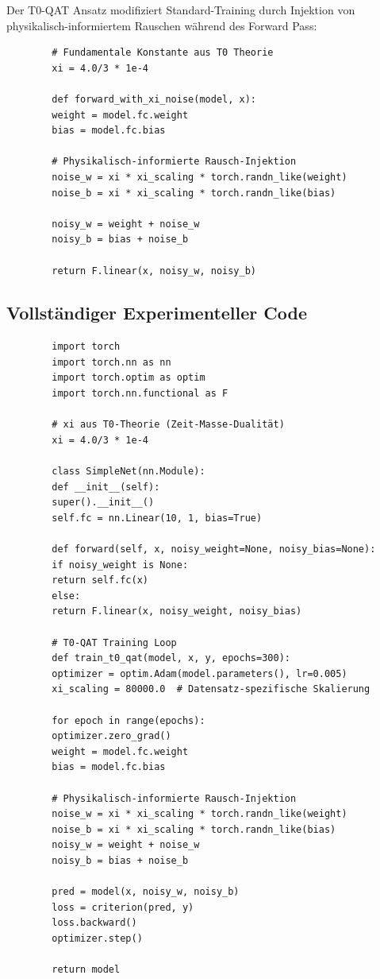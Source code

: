 	Der T0-QAT Ansatz modifiziert Standard-Training durch Injektion von physikalisch-informiertem Rauschen während des Forward Pass:
	
	\begin{verbatim}
		# Fundamentale Konstante aus T0 Theorie
		xi = 4.0/3 * 1e-4
		
		def forward_with_xi_noise(model, x):
		weight = model.fc.weight
		bias = model.fc.bias
		
		# Physikalisch-informierte Rausch-Injektion
		noise_w = xi * xi_scaling * torch.randn_like(weight)
		noise_b = xi * xi_scaling * torch.randn_like(bias)
		
		noisy_w = weight + noise_w
		noisy_b = bias + noise_b
		
		return F.linear(x, noisy_w, noisy_b)
	\end{verbatim}
	
	\subsection{Vollständiger Experimenteller Code}
	
	\begin{verbatim}
		import torch
		import torch.nn as nn
		import torch.optim as optim
		import torch.nn.functional as F
		
		# xi aus T0-Theorie (Zeit-Masse-Dualität)
		xi = 4.0/3 * 1e-4
		
		class SimpleNet(nn.Module):
		def __init__(self):
		super().__init__()
		self.fc = nn.Linear(10, 1, bias=True)
		
		def forward(self, x, noisy_weight=None, noisy_bias=None):
		if noisy_weight is None:
		return self.fc(x)
		else:
		return F.linear(x, noisy_weight, noisy_bias)
		
		# T0-QAT Training Loop
		def train_t0_qat(model, x, y, epochs=300):
		optimizer = optim.Adam(model.parameters(), lr=0.005)
		xi_scaling = 80000.0  # Datensatz-spezifische Skalierung
		
		for epoch in range(epochs):
		optimizer.zero_grad()
		weight = model.fc.weight
		bias = model.fc.bias
		
		# Physikalisch-informierte Rausch-Injektion
		noise_w = xi * xi_scaling * torch.randn_like(weight)
		noise_b = xi * xi_scaling * torch.randn_like(bias)
		noisy_w = weight + noise_w
		noisy_b = bias + noise_b
		
		pred = model(x, noisy_w, noisy_b)
		loss = criterion(pred, y)
		loss.backward()
		optimizer.step()
		
		return model
	\end{verbatim}
	
